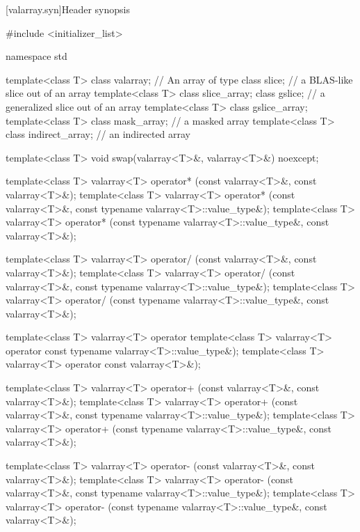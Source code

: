 [valarray.syn]{Header  synopsis}
%
\begin{codeblock}
#include <initializer_list>

namespace std {
  template<class T> class valarray;         // An array of type 
  class slice;                              // a BLAS-like slice out of an array
  template<class T> class slice_array;
  class gslice;                             // a generalized slice out of an array
  template<class T> class gslice_array;
  template<class T> class mask_array;       // a masked array
  template<class T> class indirect_array;   // an indirected array

  template<class T> void swap(valarray<T>&, valarray<T>&) noexcept;

  template<class T> valarray<T> operator* (const valarray<T>&, const valarray<T>&);
  template<class T> valarray<T> operator* (const valarray<T>&,
                                           const typename valarray<T>::value_type&);
  template<class T> valarray<T> operator* (const typename valarray<T>::value_type&,
                                           const valarray<T>&);

  template<class T> valarray<T> operator/ (const valarray<T>&, const valarray<T>&);
  template<class T> valarray<T> operator/ (const valarray<T>&,
                                           const typename valarray<T>::value_type&);
  template<class T> valarray<T> operator/ (const typename valarray<T>::value_type&,
                                           const valarray<T>&);

  template<class T> valarray<T> operator%
  template<class T> valarray<T> operator%
                                           const typename valarray<T>::value_type&);
  template<class T> valarray<T> operator%
                                           const valarray<T>&);

  template<class T> valarray<T> operator+ (const valarray<T>&, const valarray<T>&);
  template<class T> valarray<T> operator+ (const valarray<T>&,
                                           const typename valarray<T>::value_type&);
  template<class T> valarray<T> operator+ (const typename valarray<T>::value_type&,
                                           const valarray<T>&);

  template<class T> valarray<T> operator- (const valarray<T>&, const valarray<T>&);
  template<class T> valarray<T> operator- (const valarray<T>&,
                                           const typename valarray<T>::value_type&);
  template<class T> valarray<T> operator- (const typename valarray<T>::value_type&,
                                           const valarray<T>&);

}
\end{codeblock}
